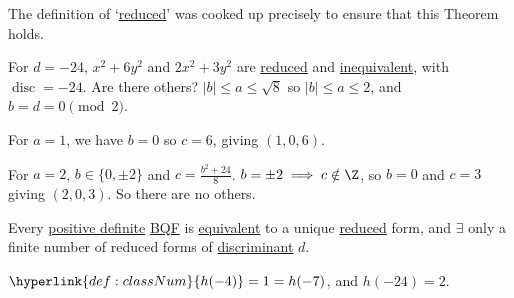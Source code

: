 \documentclass{article}
\DeclareMathOperator{\disc}{disc}
\begin{document}
\begin{remark}
    The definition of `\hyperlink{def:reduced}{reduced}' was cooked up precisely to ensure that this Theorem holds.
\end{remark}

\begin{eg}
    For $d = -24$, $x^2 + 6y^2$ and $2x^2 + 3y^2$ are \hyperlink{def:reduced}{reduced} and \hyperlink{def:uniSub}{inequivalent}, with $\disc = -24$.
    Are there others?
    $|b| \leq a \leq \sqrt{8}$ so $|b| \leq a \leq 2$, and $b = d = 0 \pmod{2}$.

    For $a = 1$, we have $b=0$ so $c = 6$, giving $(1, 0, 6)$.

    For $a=2$, $b\in \{0, \pm 2\}$ and $c = \frac{b^2 +24}{8}$. $b = \pm 2 \implies c \notin \Z$, so $b=0$ and $c=3$ giving $(2, 0, 3)$.
    So there are no others.
\end{eg}


Every \hyperlink{def:definite}{positive definite} \hyperlink{def:bqf}{BQF} is \hyperlink{def:uniSub}{equivalent} to a unique \hyperlink{def:reduced}{reduced} form, and $\exists$ only a finite number of reduced forms of \hyperlink{def:disc}{discriminant} $d$.

\begin{eg}
    $\hyperlink{def:classNum}{h(-4)} = 1 = h(-7)$, and $h(-24) = 2$.
\end{eg}
\end{document}
